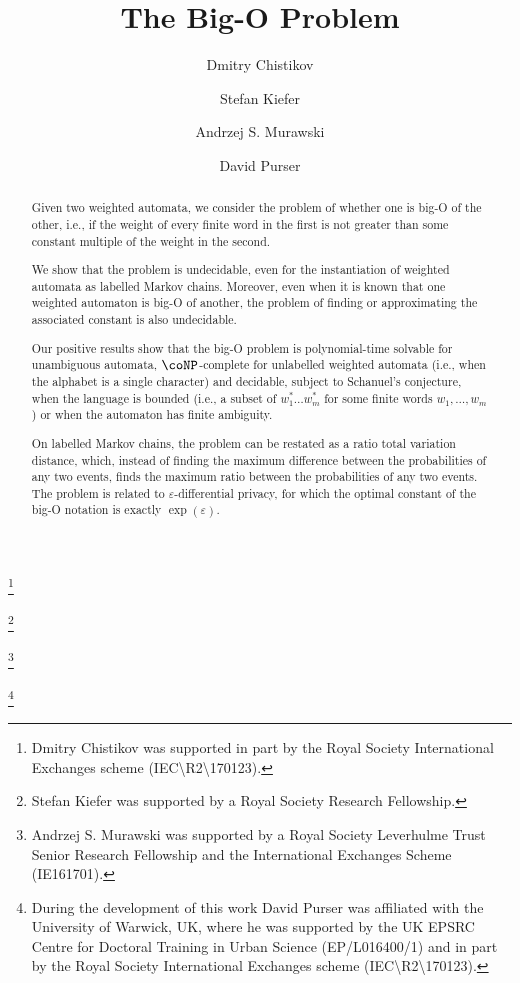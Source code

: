 \documentclass{lmcs}
\theoremstyle{plain}
\theoremstyle{definition}
\theoremstyle{remark}
\begin{document}
\title{The Big-O Problem}

  \author[D.~Chistikov]{Dmitry Chistikov}
  \address{Centre for Discrete Mathematics and its Applications (DIMAP) \& Department of Computer Science, University of Warwick, UK}
  \thanks{Dmitry Chistikov was supported in part by the Royal Society International Exchanges scheme (IEC\textbackslash{}R2\textbackslash{}170123).}
\author[S.~Kiefer]{Stefan Kiefer}
\address{Department of Computer Science, University of Oxford, UK}
\thanks{Stefan Kiefer was supported by a Royal Society Research Fellowship.}
\author[A.~S.~Murawski]{Andrzej S. Murawski}
\thanks{Andrzej S. Murawski was supported by a Royal Society Leverhulme Trust Senior Research Fellowship and the International Exchanges Scheme (IE161701).}
\author[D.~Purser]{David Purser}
\address{Max Planck Institute for Software Systems, Saarland Informatics Campus, Germany}
\thanks{
During the development of this work David Purser was affiliated with the University of Warwick, UK, where he was supported by the UK EPSRC Centre for Doctoral Training in Urban Science (EP/L016400/1)
and in part
by the Royal Society International Exchanges scheme (IEC\textbackslash{}R2\textbackslash{}170123).
}


\begin{abstract}
  \noindent Given two weighted automata, we consider the problem of whether one is big-O of the other, i.e.,  if the weight of every finite word in the first is not greater than some constant multiple of the weight in the second. 

We show that the problem is undecidable, even for the instantiation of weighted automata as labelled Markov chains. Moreover, even when it is known that one weighted automaton is big-O of another, 
the problem of finding or approximating the associated constant is also undecidable. 

Our positive results show that the big-O problem is polynomial-time solvable for unambiguous automata, $\coNP$-complete for unlabelled weighted automata (i.e., when the alphabet is a single character) and decidable, subject to Schanuel's conjecture, when the language is bounded (i.e., a subset of $w_1^*\dots w_m^*$ for some finite words $w_1,\dots,w_m$) or when the automaton has finite ambiguity. 

On labelled Markov chains, the problem can be restated as a ratio total variation distance, which, instead of finding the maximum difference between the probabilities of any two events, finds the maximum ratio between the probabilities of any two events. The problem is related to $\varepsilon$-differential privacy, for which the optimal constant of the big-O notation is exactly $\exp(\varepsilon)$.
\end{abstract}
\end{document}
